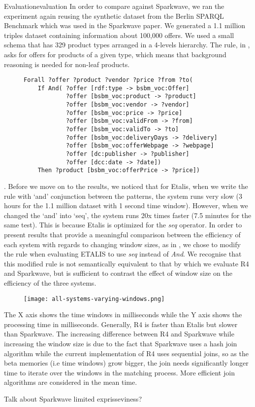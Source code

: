 \begin{nestedsection}{Evaluation}{evaluation}
	In order to compare against Sparkwave, we ran the experiment again reusing the synthetic dataset from the Berlin SPARQL Benchmark \citep{BSBMresults} which was used in the Sparkwave paper.
	We generated a 1.1 million triples dataset containing information about 100,000 offers.
	We used a small schema that has 329 product types arranged in a 4-levels hierarchy.
	The rule, in , asks for offers for products of a given type, which means that background reasoning is needed for non-leaf products.
	\begin{figure}
		\centering
		\begin{lstlisting}
Forall ?offer ?product ?vendor ?price ?from ?to(
    If And( ?offer [rdf:type -> bsbm_voc:Offer]
            ?offer [bsbm_voc:product -> ?product]
            ?offer [bsbm_voc:vendor -> ?vendor]
            ?offer [bsbm_voc:price -> ?price]
            ?offer [bsbm_voc:validFrom -> ?from]
            ?offer [bsbm_voc:validTo -> ?to]
            ?offer [bsbm_voc:deliveryDays -> ?delivery]
            ?offer [bsbm_voc:offerWebpage -> ?webpage]
            ?offer [dc:publisher -> ?publisher]
            ?offer [dcc:date -> ?date])
    Then ?product [bsbm_voc:offerPrice -> ?price])
		\end{lstlisting}
		\caption{}
	\end{figure}.
	Before we move on to the results, we noticed that for Etalis, when we write the rule with ‘and’ conjunction between the patterns, the system runs very slow (3 hours for the 1.1 million dataset with 1 second time window).
	However, when we changed the `and' into `seq', the system runs 20x times faster (7.5 minutes for the same test).
	This is because Etalis is optimized for the \emph{seq} operator.
	In order to present results that provide a meaningful comparison between the efficiency of each system with regards to changing window sizes, as in , we chose to modify the rule when evaluating ETALIS to use \emph{seq} instead of \emph{And}.
	We recognise that this modified rule is not semantically equivalent to that by which we evaluate R4 and Sparkwave, but is sufficient to contrast the effect of window size on the efficiency of the three systems.
	\begin{figure}
		\centering
		\texttt{[image: all-systems-varying-windows.png]}
		\caption{}
	\end{figure}
	The X axis shows the time windows in milliseconds while the Y axis shows the processing time in milliseconds.
	Generally, R4 is faster than Etalis but slower than Sparkwave.
	The increasing difference between R4 and Sparkwave while increasing the window size is due to the fact that Sparkwave uses a hash join algorithm while the current implementation of R4 uses sequential joins, so as the beta memories (i.e time windows) grow bigger, the join needs significantly longer time to iterate over the windows in the matching process.
	More efficient join algorithms are considered in the mean time.

	Talk about Sparkwave limited exprisseviness?

\end{nestedsection}